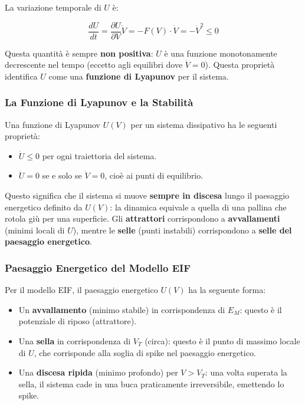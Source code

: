 La variazione temporale di $U$ è:

\begin{equation}
\frac{dU}{dt} = \frac{\partial U}{\partial V} \dot{V} = -F(V) \cdot \dot{V} = -\dot{V}^2 \leq 0
\end{equation}

Questa quantità è sempre \textbf{non positiva}: $U$ è una funzione monotonamente decrescente nel tempo (eccetto agli equilibri dove $\dot{V} = 0$). Questa proprietà identifica $U$ come una \textbf{funzione di Lyapunov} per il sistema.

\subsubsection{La Funzione di Lyapunov e la Stabilità}

Una funzione di Lyapunov $U(V)$ per un sistema dissipativo ha le seguenti proprietà:
\begin{itemize}
    \item $\dot{U} \leq 0$ per ogni traiettoria del sistema.
    \item $\dot{U} = 0$ se e solo se $\dot{V} = 0$, cioè ai punti di equilibrio.
\end{itemize}

Questo significa che il sistema si muove \textbf{sempre in discesa} lungo il paesaggio energetico definito da $U(V)$: la dinamica equivale a quella di una pallina che rotola giù per una superficie. Gli \textbf{attrattori} corrispondono a \textbf{avvallamenti} (minimi locali di $U$), mentre le \textbf{selle} (punti instabili) corrispondono a \textbf{selle del paesaggio energetico}.

\subsubsection{Paesaggio Energetico del Modello EIF}

Per il modello EIF, il paesaggio energetico $U(V)$ ha la seguente forma:
\begin{itemize}
    \item Un \textbf{avvallamento} (minimo stabile) in corrispondenza di $E_M$: questo è il potenziale di riposo (attrattore).
    \item Una \textbf{sella} in corrispondenza di $V_T$ (circa): questo è il punto di massimo locale di $U$, che corrisponde alla soglia di spike nel paesaggio energetico.
    \item Una \textbf{discesa ripida} (minimo profondo) per $V > V_T$: una volta superata la sella, il sistema cade in una buca praticamente irreversibile, emettendo lo spike.
\end{itemize}


